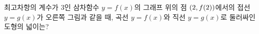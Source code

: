 \noindent\begin{minipage}[t]{0.58\linewidth}\vspace{0pt}\raggedright 최고차항의 계수가 $3$인 삼차함수 $y=f(x)$의 그래프 위의 점 $(2{,}\mkern3mu\mathopen{}f(2))$에서의 접선 $y=g(x)$가 오른쪽 그림과 같을 때, 곡선 $y=f(x)$와 직선 $y=g(x)$로 둘러싸인 도형의 넓이는?\end{minipage}\hfill\begin{minipage}[t]{0.4\linewidth}\vspace{0pt}\centering \resizebox{\ifdim\width>\linewidth\linewidth\else\width\fi}{!}{}\end{minipage}\par
{}
